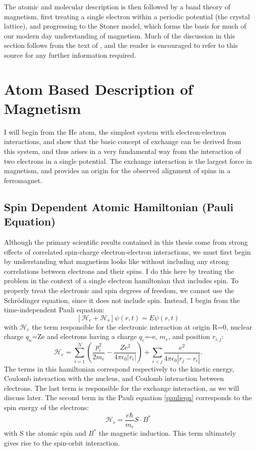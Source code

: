 The atomic and molecular description is then followed by a band theory of magnetism, first treating a single electron within a periodic potential (the crystal lattice), and progressing to the Stoner model, which forms the basis for much of our modern day understanding of magnetism. Much of the discussion in this section follows from the text of \cite{Stohr2006}, and the reader is encouraged to refer to this source for any further information required. 

\section{Atom Based Description of Magnetism}
I will begin from the He atom, the simplest system with electron-electron interactions, and show that the basic concept of exchange can be derived from this system, and thus arises in a very fundamental way from the interaction of two electrons in a single potential. The exchange interaction is the largest force in magnetism, and provides an origin for the observed alignment of spins in a ferromagnet. 

\subsection{Spin Dependent Atomic Hamiltonian (Pauli Equation)}
Although the primary scientific results contained in this thesis come from strong effects of correlated spin-charge electron-electron interactions, we must first begin by understanding what magnetism looks like without including any strong correlations between electrons and their spins. I do this here by treating the problem in the context of  a single electron hamiltonian that includes spin. To properly treat the electronic and spin degrees of freedom, we cannot use the Schr\"odinger equation, since it does not include spin. Instead, I begin from the time-independent Pauli equation:
\begin{equation}
 \left[\mathscr{H}_e+\mathscr{H}_s\right]\psi\left(r,t\right) = E \psi \left(r,t\right)
 \label{paulieqn}
 \end{equation}
 with $\mathscr{H}_e$ the term responsible for the electronic interaction at origin R=0, nuclear charge $q_n$=Ze and electrons having a charge $q_e$=-e, $m_e$, and position $r_{i,j}$:
  \begin{equation}
\mathscr{H}_e = \sum_{i=1}^{N}\left(\frac{p_i^2}{2m_e}-\frac{Ze^2}{4\pi\epsilon_0|r_i|}\right) + \sum_{i<j}\frac{e^2}{4\pi\epsilon_0|r_j-r_i|}.
\label{chargeham}
 \end{equation}
The terms in this hamiltonian correspond respectively to the kinetic energy, Coulomb interaction with the nucleus, and Coulomb interaction between electrons. The last term is responsible for the exchange interaction, as we will discuss later.
The second term in the Pauli equation \ref{paulieqn} corresponds to the spin energy of the electrons:
\begin{equation}
\mathscr{H}_s=\frac{e\hbar}{m_e}S\cdot B^*
\label{spinham}
\end{equation}
with S the atomic spin and $B^*$ the magnetic induction. This term ultimately gives rise to the spin-orbit interaction.

